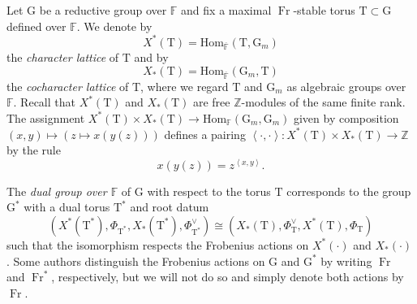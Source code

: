 \documentclass[12pt, reqno]{amsart}
\theoremstyle{definition}
\theoremstyle{definition}
\theoremstyle{definition}
\newcommand{\zIntegers}{\mathbb{Z}}
\newcommand{\Hom}{\mathrm{Hom}}
\newcommand{\innerproduct}[2]{\left\langle #1,#2\right\rangle}
\newcommand{\finiteField}{\mathbb{F}}
\newcommand{\algebraicClosure}[1]{\overline{#1}}
\newcommand{\Frobenius}{\operatorname{Fr}}
\newcommand{\multiplcativeScheme}{\algebraicGroup{G}_m}
\newcommand{\algebraicGroup}[1]{\boldsymbol{\mathrm{#1}}}
\newcommand{\CharacterLattice}[1]{X^{\ast}\left(#1\right)}
\newcommand{\CocharacterLattice}[1]{X_{\ast}\left(#1\right)}
\begin{document}
Let $\algebraicGroup{G}$ be a reductive group over $\finiteField$ and fix a maximal $\Frobenius$-stable torus $\algebraicGroup{T} \subset \algebraicGroup{G}$ defined over $\finiteField$. We denote by $$\CharacterLattice{\algebraicGroup{T}} = \Hom_{\algebraicClosure{\finiteField}}\left(\algebraicGroup{T}, \multiplcativeScheme\right)$$ the \emph{character lattice} of $\algebraicGroup{T}$ and by $$\CocharacterLattice{\algebraicGroup{T}} = \Hom_{\algebraicClosure{\finiteField}}\left(\multiplcativeScheme, \algebraicGroup{T}\right)$$ the \emph{cocharacter lattice} of $\algebraicGroup{T}$, where we regard $\algebraicGroup{T}$ and $\multiplcativeScheme$ as algebraic groups over $\finiteField$. Recall that $\CharacterLattice{\algebraicGroup{T}}$ and $\CocharacterLattice{\algebraicGroup{T}}$ are free $\zIntegers$-modules of the same finite rank. The assignment $\CharacterLattice{\algebraicGroup{T}} \times \CocharacterLattice{\algebraicGroup{T}} \to \Hom_{\finiteField}\left(\multiplcativeScheme, \multiplcativeScheme\right)$ given by composition $\left(x,y\right) \mapsto \left(z \mapsto x\left(y\left(z\right)\right)\right)$ defines a pairing $\innerproduct{\cdot}{\cdot} \colon \CharacterLattice{\algebraicGroup{T}} \times \CocharacterLattice{\algebraicGroup{T}} \to \zIntegers$ by the rule $$x\left(y\left(z\right)\right) = z^{\innerproduct{x}{y}}.$$

The \emph{dual group over $\finiteField$} of $\algebraicGroup{G}$ with respect to the torus $\algebraicGroup{T}$ corresponds to the group $\algebraicGroup{G}^*$ with a dual torus $\algebraicGroup{T}^*$ and root datum
\[
(\CharacterLattice{\algebraicGroup{T}^*},\Phi_{\algebraicGroup{T}^*},\CocharacterLattice{\algebraicGroup{T}^*},\Phi_{\algebraicGroup{T}^*}^\vee) \cong (\CocharacterLattice{\algebraicGroup{T}},\Phi_{\algebraicGroup{T}}^\vee,\CharacterLattice{\algebraicGroup{T}},\Phi_{\algebraicGroup{T}})
\]
such that the isomorphism respects the Frobenius actions on $\CharacterLattice{\cdot}$ and $\CocharacterLattice{\cdot}$. Some authors distinguish the Frobenius actions on $\algebraicGroup{G}$ and $\algebraicGroup{G}^{\ast}$ by writing $\Frobenius$ and $\Frobenius^{\ast}$, respectively, but we will not do so and simply denote both actions by $\Frobenius$.
\end{document}
